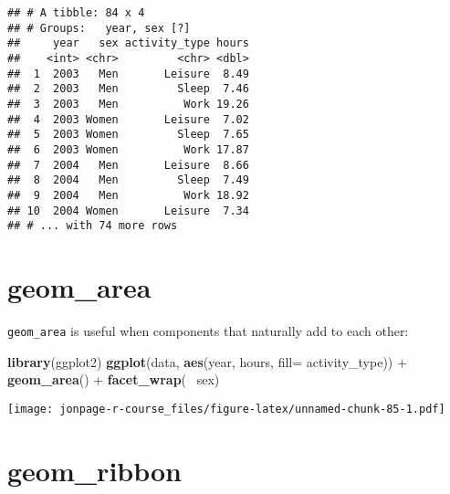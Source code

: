 \documentclass[]{book}
\newenvironment{Shaded}{\begin{snugshade}}{\end{snugshade}}
\newcommand{\KeywordTok}[1]{\textcolor[rgb]{0.13,0.29,0.53}{\textbf{{#1}}}}
\newcommand{\DataTypeTok}[1]{\textcolor[rgb]{0.13,0.29,0.53}{{#1}}}
\newcommand{\StringTok}[1]{\textcolor[rgb]{0.31,0.60,0.02}{{#1}}}
\newcommand{\NormalTok}[1]{{#1}}
\theoremstyle{definition}
\theoremstyle{definition}
\theoremstyle{remark}
\begin{document}
\begin{verbatim}
## # A tibble: 84 x 4
## # Groups:   year, sex [?]
##     year   sex activity_type hours
##    <int> <chr>         <chr> <dbl>
##  1  2003   Men       Leisure  8.49
##  2  2003   Men         Sleep  7.46
##  3  2003   Men          Work 19.26
##  4  2003 Women       Leisure  7.02
##  5  2003 Women         Sleep  7.65
##  6  2003 Women          Work 17.87
##  7  2004   Men       Leisure  8.66
##  8  2004   Men         Sleep  7.49
##  9  2004   Men          Work 18.92
## 10  2004 Women       Leisure  7.34
## # ... with 74 more rows
\end{verbatim}

\section{geom\_area}\label{geom_area}

\texttt{geom\_area} is useful when components that naturally add to each
other:

\begin{Shaded}
\begin{Highlighting}[]
\KeywordTok{library}\NormalTok{(ggplot2)}
\KeywordTok{ggplot}\NormalTok{(data, }\KeywordTok{aes}\NormalTok{(year, hours, }\DataTypeTok{fill=} \NormalTok{activity_type)) +}\StringTok{ }\KeywordTok{geom_area}\NormalTok{() +}\StringTok{ }\KeywordTok{facet_wrap}\NormalTok{(~}\StringTok{ }\NormalTok{sex) }
\end{Highlighting}
\end{Shaded}

\texttt{[image: jonpage-r-course\_files/figure-latex/unnamed-chunk-85-1.pdf]}

\section{geom\_ribbon}\label{geom_ribbon}
\end{document}
